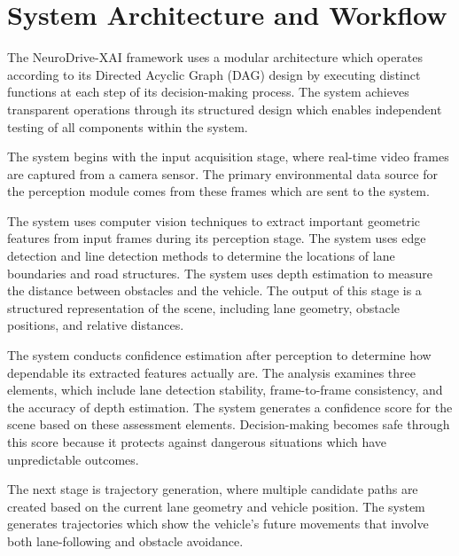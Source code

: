 \documentclass[conference]{IEEEtran}
\begin{document}
\section{System Architecture and Workflow}
The NeuroDrive-XAI framework uses a modular architecture which operates according to its Directed Acyclic Graph (DAG) design by executing distinct functions at each step of its decision-making process. The system achieves transparent operations through its structured design which enables independent testing of all components within the system.

The system begins with the input acquisition stage, where real-time video frames are captured from a camera sensor. The primary environmental data source for the perception module comes from these frames which are sent to the system.

The system uses computer vision techniques to extract important geometric features from input frames during its perception stage. The system uses edge detection and line detection methods to determine the locations of lane boundaries and road structures. The system uses depth estimation to measure the distance between obstacles and the vehicle. The output of this stage is a structured representation of the scene, including lane geometry, obstacle positions, and relative distances.

The system conducts confidence estimation after perception to determine how dependable its extracted features actually are. The analysis examines three elements, which include lane detection stability, frame-to-frame consistency, and the accuracy of depth estimation. The system generates a confidence score for the scene based on these assessment elements. Decision-making becomes safe through this score because it protects against dangerous situations which have unpredictable outcomes.

The next stage is trajectory generation, where multiple candidate paths are created based on the current lane geometry and vehicle position. The system generates trajectories which show the vehicle's future movements that involve both lane-following and obstacle avoidance.
\end{document}
